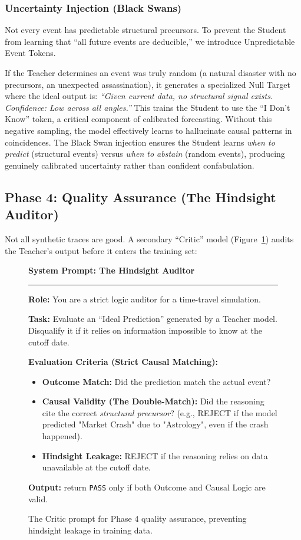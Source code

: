 \documentclass[11pt,a4paper]{article}
\newenvironment{promptbox}[1]
  {\def\FrameCommand{\fboxsep=8pt\fcolorbox{black}{gray!10}}%
    \MakeFramed {\advance\hsize-\width \FrameRestore}
    \textbf{#1}\par\vspace{3pt}\hrule\vspace{5pt}}
  {\endMakeFramed}
\begin{document}
\subsubsection{Uncertainty Injection (Black Swans)}

Not every event has predictable structural precursors. To prevent the Student from learning that ``all future events are deducible,'' we introduce Unpredictable Event Tokens.

If the Teacher determines an event was truly random (a natural disaster with no precursors, an unexpected assassination), it generates a specialized Null Target where the ideal output is: \textit{``Given current data, no structural signal exists. Confidence: Low across all angles.''} This trains the Student to use the ``I Don't Know'' token, a critical component of calibrated forecasting. Without this negative sampling, the model effectively learns to hallucinate causal patterns in coincidences. The Black Swan injection ensures the Student learns \textit{when to predict} (structural events) versus \textit{when to abstain} (random events), producing genuinely calibrated uncertainty rather than confident confabulation.

\subsection{Phase 4: Quality Assurance (The Hindsight Auditor)}
Not all synthetic traces are good. A secondary ``Critic'' model (Figure~\ref{fig:critic_prompt}) audits the Teacher's output before it enters the training set:

\begin{figure}[h]
\begin{promptbox}{System Prompt: The Hindsight Auditor}
\textbf{Role:} You are a strict logic auditor for a time-travel simulation.

\textbf{Task:} Evaluate an ``Ideal Prediction'' generated by a Teacher model. Disqualify it if it relies on information impossible to know at the cutoff date.

\textbf{Evaluation Criteria (Strict Causal Matching):}
\begin{itemize}
    \item \textbf{Outcome Match:} Did the prediction match the actual event?
    \item \textbf{Causal Validity (The Double-Match):} Did the reasoning cite the correct \textit{structural precursor}? (e.g., REJECT if the model predicted "Market Crash" due to "Astrology", even if the crash happened).
    \item \textbf{Hindsight Leakage:} REJECT if the reasoning relies on data unavailable at the cutoff date.
\end{itemize}

\textbf{Output:} return \texttt{PASS} only if both Outcome and Causal Logic are valid.
\end{promptbox}
\caption{The Critic prompt for Phase 4 quality assurance, preventing hindsight leakage in training data.}
\label{fig:critic_prompt}
\end{figure}
\end{document}
